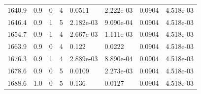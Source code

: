\documentclass[preview]{standalone}
\begin{document}
{{{{{{\begin{tabular}{L{1.2cm}C{1.2cm} C{0.3cm}C{0.5cm} C{1.4cm}C{1.4cm} C{1.4cm}C{1.4cm}}
  1640.9  &   0.9  & 0     &  4 &  0.0511  & 2.222e-03  & 0.0904 &  4.518e-03   \\ 
  1646.4  &   0.9  & 1     &  5 &  2.182e-03  & 9.090e-04  & 0.0904 &  4.518e-03   \\ 
  1654.7  &   0.9  & 1     &  4 &  2.667e-03  & 1.111e-03  & 0.0904 &  4.518e-03   \\ 
  1663.9  &   0.9  & 0     &  4 &  0.122  & 0.0222  & 0.0904 &  4.518e-03   \\ 
  1676.3  &   0.9  & 1     &  4 &  2.889e-03  & 8.890e-04  & 0.0904 &  4.518e-03   \\ 
  1678.6  &   0.9  & 0     &  5 &  0.0109  & 2.273e-03  & 0.0904 &  4.518e-03   \\ 
  1688.6  &   1.0  & 0     &  5 &  0.136  & 0.0127  & 0.0904 &  4.518e-03   \\ 
\hline 
\end{tabular} 

}}}}}}
\end{document}
